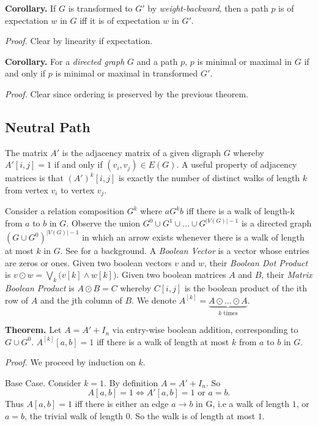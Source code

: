 \documentclass[pdflatex,sn-mathphys-num]{sn-jnl}%
\begin{document}
\textbf{Corollary.} If $G$ is transformed to $G'$ by \textit{weight-backward}, then a path $p$ is of expectation $w$ in $G$ iff it is of expectation $w$ in $G'$.

\textit{Proof.} Clear by linearity if expectation.

\textbf{Corollary.} For a \textit{directed graph} $G$ and a path $p$, $p$ is minimal or maximal in $G$ if and only if $p$ is minimal or maximal in transformed $G'$.

\textit{Proof.} Clear since ordering is preserved by the previous theorem.


\subsection{Neutral Path} \label{Neutral Path}

The matrix $A'$ is the adjacency matrix of a given digraph $G$ whereby $A'[i,j] = 1$ if and only if $(v_i, v_j) \in E(G)$. A useful property of adjacency matrices is that $(A')^k[i,j]$ is exactly the number of distinct walks of length $k$ from vertex $v_i$ to vertex $v_j$. 

Consider a relation composition $G^k$ where $a G^k b$ iff there is a walk of length-k from $a$ to $b$ in $G$. Observe the union $G^0 \cup G^1 \cup \dots \cup G^{|V(G)|-1}$ is a directed graph $(G \cup G^0)^{|V(G)|-1}$ in which an arrow exists whenever there is a walk of length at most $k$ in $G$. See \cite{discreteHandbook} for a background. A \textit{Boolean Vector} is a vector whose entries are zeros or ones. Given two boolean vectors $v$ and $w$, their \textit{Boolean Dot Product} is $v \odot w = \bigvee_k \big ( v[k] \wedge w[k] \big )$. Given two boolean matrices $A$ and $B$, their \textit{Matrix Boolean Product} is $A \odot B = C$ whereby $C[i,j]$ is the boolean product of the ith row of $A$ and the jth column of $B$. We denote $A^{[k]} = \underbrace{A \odot \dots \odot A}_{k \text{ times}}$.

\textbf{Theorem.} Let $A = A' + I_n$ via entry-wise boolean addition, corresponding to $G \cup G^0$. $A^{[k]}[a,b] = 1$ iff there is a walk of length at most $k$ from $a$ to $b$ in $G$.

\textit{Proof.} We proceed by induction on $k$.

Base Case. Consider $k = 1$. By definition $A = A' + I_n$. So
$$
A[ a,b ] = 1 \iff A'[a,b]=1 \text{ or } a = b.
$$
Thus $A[a,b]=1$ iff there is either an edge $a \to b$ in G, i.e a walk of length $1$, or $a=b$, the trivial walk of length $0$. So the walk is of length at most $1$.
\end{document}

